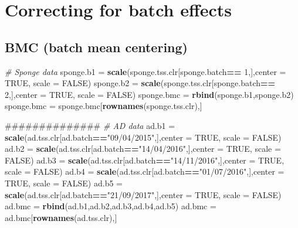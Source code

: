 \documentclass[]{book}
\newenvironment{Shaded}{\begin{snugshade}}{\end{snugshade}}
\newcommand{\KeywordTok}[1]{\textcolor[rgb]{0.13,0.29,0.53}{\textbf{#1}}}
\newcommand{\DataTypeTok}[1]{\textcolor[rgb]{0.13,0.29,0.53}{#1}}
\newcommand{\DecValTok}[1]{\textcolor[rgb]{0.00,0.00,0.81}{#1}}
\newcommand{\StringTok}[1]{\textcolor[rgb]{0.31,0.60,0.02}{#1}}
\newcommand{\CommentTok}[1]{\textcolor[rgb]{0.56,0.35,0.01}{\textit{#1}}}
\newcommand{\OtherTok}[1]{\textcolor[rgb]{0.56,0.35,0.01}{#1}}
\newcommand{\OperatorTok}[1]{\textcolor[rgb]{0.81,0.36,0.00}{\textbf{#1}}}
\newcommand{\NormalTok}[1]{#1}
\begin{document}
\section{Correcting for batch
effects}\label{correcting-for-batch-effects}

\subsection{BMC (batch mean centering)}\label{bmc-batch-mean-centering}

\begin{Shaded}
\begin{Highlighting}[]
\CommentTok{# Sponge data}
\NormalTok{sponge.b1 =}\StringTok{ }\KeywordTok{scale}\NormalTok{(sponge.tss.clr[sponge.batch}\OperatorTok{==}\StringTok{ }\DecValTok{1}\NormalTok{,],}\DataTypeTok{center =} \OtherTok{TRUE}\NormalTok{, }\DataTypeTok{scale =} \OtherTok{FALSE}\NormalTok{)}
\NormalTok{sponge.b2 =}\StringTok{ }\KeywordTok{scale}\NormalTok{(sponge.tss.clr[sponge.batch}\OperatorTok{==}\StringTok{ }\DecValTok{2}\NormalTok{,],}\DataTypeTok{center =} \OtherTok{TRUE}\NormalTok{, }\DataTypeTok{scale =} \OtherTok{FALSE}\NormalTok{)}
\NormalTok{sponge.bmc =}\StringTok{ }\KeywordTok{rbind}\NormalTok{(sponge.b1,sponge.b2)}
\NormalTok{sponge.bmc =}\StringTok{ }\NormalTok{sponge.bmc[}\KeywordTok{rownames}\NormalTok{(sponge.tss.clr),]}

\NormalTok{##############}
\CommentTok{# AD data}
\NormalTok{ad.b1 =}\StringTok{ }\KeywordTok{scale}\NormalTok{(ad.tss.clr[ad.batch}\OperatorTok{==}\StringTok{"09/04/2015"}\NormalTok{,],}\DataTypeTok{center =} \OtherTok{TRUE}\NormalTok{, }\DataTypeTok{scale =} \OtherTok{FALSE}\NormalTok{)}
\NormalTok{ad.b2 =}\StringTok{ }\KeywordTok{scale}\NormalTok{(ad.tss.clr[ad.batch}\OperatorTok{==}\StringTok{"14/04/2016"}\NormalTok{,],}\DataTypeTok{center =} \OtherTok{TRUE}\NormalTok{, }\DataTypeTok{scale =} \OtherTok{FALSE}\NormalTok{)}
\NormalTok{ad.b3 =}\StringTok{ }\KeywordTok{scale}\NormalTok{(ad.tss.clr[ad.batch}\OperatorTok{==}\StringTok{"14/11/2016"}\NormalTok{,],}\DataTypeTok{center =} \OtherTok{TRUE}\NormalTok{, }\DataTypeTok{scale =} \OtherTok{FALSE}\NormalTok{)}
\NormalTok{ad.b4 =}\StringTok{ }\KeywordTok{scale}\NormalTok{(ad.tss.clr[ad.batch}\OperatorTok{==}\StringTok{"01/07/2016"}\NormalTok{,],}\DataTypeTok{center =} \OtherTok{TRUE}\NormalTok{, }\DataTypeTok{scale =} \OtherTok{FALSE}\NormalTok{)}
\NormalTok{ad.b5 =}\StringTok{ }\KeywordTok{scale}\NormalTok{(ad.tss.clr[ad.batch}\OperatorTok{==}\StringTok{"21/09/2017"}\NormalTok{,],}\DataTypeTok{center =} \OtherTok{TRUE}\NormalTok{, }\DataTypeTok{scale =} \OtherTok{FALSE}\NormalTok{)}
\NormalTok{ad.bmc =}\StringTok{ }\KeywordTok{rbind}\NormalTok{(ad.b1,ad.b2,ad.b3,ad.b4,ad.b5)}
\NormalTok{ad.bmc =}\StringTok{ }\NormalTok{ad.bmc[}\KeywordTok{rownames}\NormalTok{(ad.tss.clr),]}
\end{Highlighting}
\end{Shaded}
\end{document}
